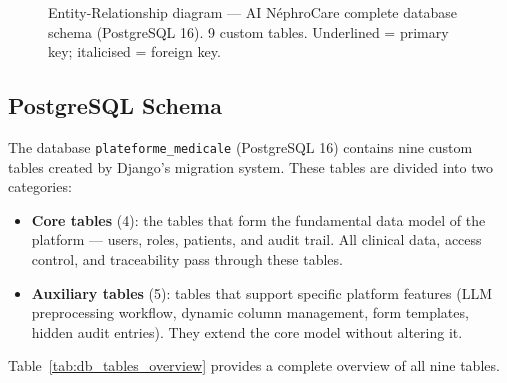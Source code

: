 \documentclass[12pt,a4paper,twoside]{report}
\begin{document}
\begin{figure}[htbp]
{
}
\caption{Entity-Relationship diagram — AI NéphroCare complete database schema (PostgreSQL 16).
9 custom tables. Underlined = primary key; italicised = foreign key.}
\label{fig:er_diagram}
\end{figure}

\subsection{PostgreSQL Schema}

The database \texttt{plateforme\_medicale} (PostgreSQL 16) contains nine custom tables created by Django's migration system. These tables are divided into two categories:

\begin{itemize}
  \item \textbf{Core tables} (4): the tables that form the fundamental data model of the platform — users, roles, patients, and audit trail. All clinical data, access control, and traceability pass through these tables.
  \item \textbf{Auxiliary tables} (5): tables that support specific platform features (LLM preprocessing workflow, dynamic column management, form templates, hidden audit entries). They extend the core model without altering it.
\end{itemize}

Table~\ref{tab:db_tables_overview} provides a complete overview of all nine tables.
\end{document}
